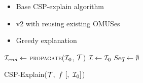 \begin{itemize}
    \item Base CSP-explain algorithm
    \item v2 with reusing existing OMUSes
    \item Greedy explanation
\end{itemize}


\begin{algorithm*}
      \DontPrintSemicolon
      $\mathcal{I}_{end} \gets$ \textsc{propagate($\mathcal{I}_0$, $\mathcal{T}$)} \;
      $\mathcal{I} \gets \mathcal{I}_0$  \;
      $Seq \gets \emptyset$  \;
    \caption{CSP-Explain($\m{T} ,\ f \ [,  \ \m{I}_0 ]$)}
    \label{alg:cspExplain}
  \end{algorithm*}

